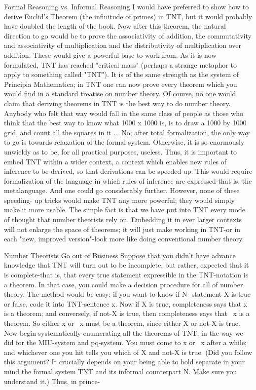                   Formal Reasoning vs. Informal Reasoning
         I would have preferred to show how to derive Euclid's Theorem (the infinitude of
primes) in TNT, but it would probably have doubled the length of the book. Now after
this theorem, the natural direction to go would be to prove the associativity of addition,
the commutativity and associativity of multiplication and the distributivity of
multiplication over addition. These would give a powerful base to work from.
         As it is now formulated, TNT has reached "critical mass" (perhaps a strange
metaphor to apply to something called "TNT"). It is of the same strength as the system of
Principia Mathematica; in TNT one can now prove every theorem which you would find
in a standard treatise on number theory. Of course, no one would claim that deriving
theorems in TNT is the best way to do number theory. Anybody who felt that way would
fall in the same class of people as those who think that the best way to know what 1000 x
1000 is, is to draw a 1000 by 1000 grid, and count all the squares in it ... No; after total
formalization, the only way to go is towards relaxation of the formal system. Otherwise,
it is so enormously unwieldy as to be, for all practical purposes, useless. Thus, it is
important to embed TNT within a wider context, a context which enables new rules of
inference to be derived, so that derivations can be speeded up. This would require
formalization of the language in which rules of inference are expressed-that is, the
metalanguage. And one could go considerably further. However, none of these speeding-
up tricks would make TNT any more powerful; they would simply make it more usable.
The simple fact is that we have put into TNT every mode of thought that number
theorists rely on. Embedding it in ever larger contexts will not enlarge the space of
theorems; it will just make working in TNT-or in each "new, improved version"-look
more like doing conventional number theory.

                          Number Theorists Go out of Business
        Suppose that you didn't have advance knowledge that TNT will turn out to be
incomplete, but rather, expected that it is complete-that is, that every true statement
expressible in the TNT-notation is a theorem. In that case, you could make a decision
procedure for all of number theory. The method would be easy: if you want to know if N-
statement X is true or false, code it into TNT-sentence x. Now if X is true, completeness
says that x is a theorem; and conversely, if not-X is true, then completeness says that ~x
is a theorem. So either x or ~x must be a theorem, since either X or not-X is true. Now
begin systematically enumerating all the theorems of TNT, in the way we did for the
MIU-system and pq-system. You must come to x or ~x after a while; and whichever one
you hit tells you which of X and not-X is true. (Did you follow this argument? It crucially
depends on your being able to hold separate in your mind the formal system TNT and its
informal counterpart N. Make sure you understand it.) Thus, in prince-




